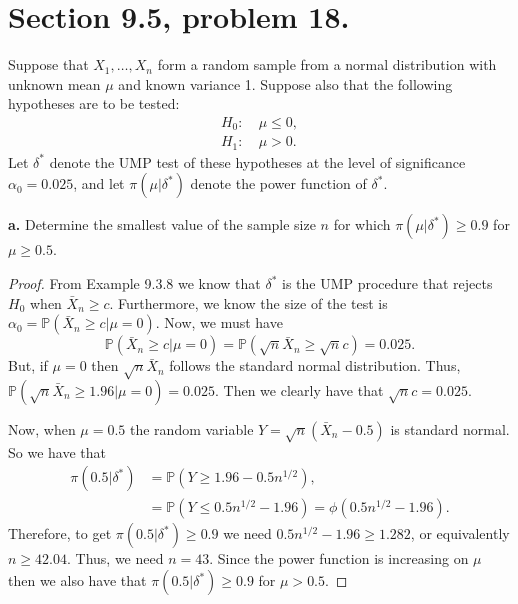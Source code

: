 \documentclass{article}
\renewcommand{\P}[1]{\mathbb{P}\left(#1\right)}
\newcommand{\randsamp}{X_1,\dots,X_n}
\newenvironment{hwproof}[1]
{
    #1
    \begin{proof}
}{
    \end{proof}
}
\begin{document}
\section{Section 9.5, problem 18.}
\begin{hwproof}
    {
        Suppose that $\randsamp$ form a random sample from a normal distribution with unknown
        mean $\mu$ and known variance 1. Suppose also that the following hypotheses are to be
        tested:
        \begin{align*}
            H_0 : & \ \mu \leq 0, \\
            H_1 : & \ \mu > 0.
        \end{align*}
        Let $\delta^*$ denote the UMP test of these hypotheses at the level of significance
        $\alpha_0 = 0.025$, and let $\pi(\mu | \delta^*)$ denote the power function of $\delta^*$.

        \textbf{a.} Determine the smallest value of the sample size $n$ for which
        $\pi(\mu | \delta^*) \geq 0.9$ for $\mu \geq 0.5$.
    }
    From Example 9.3.8 we know that $\delta^*$ is the UMP procedure that rejects
    $H_0$ when $\bar{X}_n \geq c$. Furthermore, we know the size of the test is
    $\alpha_0 = \P{\bar{X}_n \geq c | \mu = 0}$. Now, we must have
    \begin{equation*}
        \P{\bar{X}_n \geq c | \mu = 0} = \P{\sqrt{n}\bar{X}_n \geq \sqrt{n}c} = 0.025.
    \end{equation*}
    But, if $\mu = 0$ then $\sqrt{n}\bar{X}_n$ follows the standard normal distribution.
    Thus, $\P{\sqrt{n}\bar{X}_n \geq 1.96 | \mu = 0} = 0.025$. Then we clearly have
    that $\sqrt{n}c = 0.025$.

    Now, when $\mu = 0.5$ the random variable $Y = \sqrt{n}(\bar{X}_n - 0.5)$ is
    standard normal. So we have that
    \begin{align*}
        \pi(0.5 | \delta^*) & = \P{Y \geq 1.96 - 0.5n^{1/2}},                            \\
                            & =  \P{Y \leq 0.5n^{1/2} - 1.96} = \phi(0.5n^{1/2} - 1.96).
    \end{align*}
    Therefore, to get $\pi(0.5 | \delta^*) \geq 0.9$ we need
    $0.5n^{1/2} - 1.96 \geq 1.282$, or equivalently $n \geq 42.04$.
    Thus, we need $n=43$. Since the power function is increasing on $\mu$ then
    we also have that $\pi(0.5 | \delta^*) \geq 0.9$ for $\mu > 0.5$.
\end{hwproof}
\end{document}
